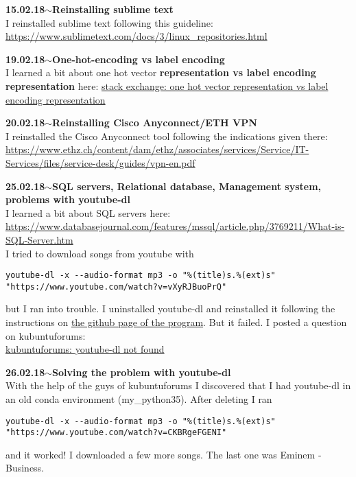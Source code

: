 \documentclass[11pt,a4paper]{article}
\newenvironment{loggentry}[2]%
{\noindent\textbf{#1}\hspace{1cm}$\mathbf{\sim}$\text{ }\textbf{#2}\\}{\vspace{0.5cm}}
\begin{document}
\begin{loggentry}{15.02.18}{Reinstalling sublime text}
I reinstalled sublime text following this guideline:\\
\url{https://www.sublimetext.com/docs/3/linux_repositories.html}
\end{loggentry}

\begin{loggentry}{19.02.18}{One-hot-encoding vs label encoding}
I learned a bit about one hot vector \textbf{representation vs label encoding representation} here:
\href{https://datascience.stackexchange.com/questions/9777/one-hot-vector-representation-vs-label-encoding-for-categorical-variables#9778}{stack exchange: one hot vector representation vs label encoding representation}
\end{loggentry}

\begin{loggentry}{20.02.18}{Reinstalling Cisco Anyconnect/ETH VPN}
I reinstalled the Cisco Anyconnect tool following the indications given there:\\
\url{https://www.ethz.ch/content/dam/ethz/associates/services/Service/IT-Services/files/service-desk/guides/vpn-en.pdf}
\end{loggentry}

\begin{loggentry}{25.02.18}{SQL servers, Relational database, Management system, problems with youtube-dl}
I learned a bit about SQL servers here:\\
\url{https://www.databasejournal.com/features/mssql/article.php/3769211/What-is-SQL-Server.htm}\\
I tried to download songs from youtube with
\begin{verbatim}
youtube-dl -x --audio-format mp3 -o "%(title)s.%(ext)s" "https://www.youtube.com/watch?v=vXyRJBuoPrQ"
\end{verbatim}
but I ran into trouble. I uninstalled youtube-dl and reinstalled it following the instructions on \href{https://github.com/rg3/youtube-dl/blob/master/README.md#bugs}{the github page of the program}. But it failed. I posted a question on kubuntuforums:\\
\href{https://www.kubuntuforums.net/showthread.php/73129-youtube-dl-not-found?p=411253#post411253}{kubuntuforums: youtube-dl not found}\\
\end{loggentry}

\begin{loggentry}{26.02.18}{Solving the problem with youtube-dl}
With the help of the guys of kubuntuforums I discovered that I had youtube-dl in an old conda environment (my\_python35). After deleting I ran
\begin{verbatim}
youtube-dl -x --audio-format mp3 -o "%(title)s.%(ext)s" "https://www.youtube.com/watch?v=CKBRgeFGENI"
\end{verbatim}
and it worked! I downloaded a few more songs. The last one was Eminem - Business.
\end{loggentry}
\end{document}
